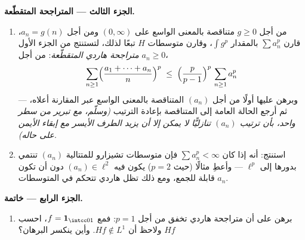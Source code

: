 \begin{problem}
\medskip
\noindent\textbf{الجزء الثالث --- المتراجحة المتقطّعة.}
\begin{enumerate}[resume]
  \item من أجل $g \geq 0$ متناقصة بالمعنى الواسع على
        $(0,\infty)$ ومن أجل $a_n = g(n)$، قارن $\sum a_n^p$
        بالمقدار $\int g^p$، وقارن متوسطات $H$ تبعًا لذلك،
        لتستنتج من الجزء الأول \emph{متراجحة هاردي المتقطّعة}:
        من أجل $a_n \geq 0$،
        \[
        \sum_{n\geq1}\Bigl(\frac{a_1 + \dots +
        a_n}{n}\Bigr)^{p}
        \;\leq\;
        \Bigl(\frac{p}{p-1}\Bigr)^{p}\,\sum_{n\geq1}a_n^p
        \]
        --- وبرهن عليها أولًا من أجل $(a_n)$ المتناقصة بالمعنى
        الواسع عبر المقارنة أعلاه، ثم أرجع الحالة العامة إلى
        المتناقصة بإعادة الترتيب \emph{(وسلّم، مع تبرير من سطر
        واحد، بأن ترتيب $(a_n)$ تنازليًّا لا يمكن إلا أن يزيد
        الطرف الأيسر مع إبقاء الأيمن على حاله)}.
  \item استنتج: أنه إذا كان $\sum a_n^p < \infty$ فإن متوسطات تشيزارو
        للمتتالية $(a_n)$ تنتمي بدورها إلى $\ell^p$ --- وأعطِ
        مثالًا (حيث $p = 2$) يكون فيه $(a_n) \in \ell^2$ دون أن تكون
        $a_n$ قابلة للجمع، ومع ذلك تظل هاردي تتحكم في
        المتوسطات.
\end{enumerate}

\medskip
\noindent\textbf{الجزء الرابع --- خاتمة.}
\begin{enumerate}[resume]
  \item برهن على أن متراجحة هاردي تخفق من أجل $p = 1$: فمع
        $f = \mathbf 1_{\intcc01}$، احسب $Hf$ ولاحظ أن $Hf \notin L^1$. وأين
        ينكسر البرهان؟
\end{enumerate}


\end{problem}
